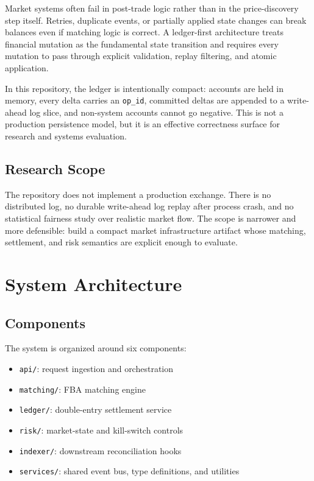 \documentclass[11pt]{article}
\begin{document}
Market systems often fail in post-trade logic rather than in the price-discovery step itself. Retries, duplicate events, or partially applied state changes can break balances even if matching logic is correct. A ledger-first architecture treats financial mutation as the fundamental state transition and requires every mutation to pass through explicit validation, replay filtering, and atomic application.

In this repository, the ledger is intentionally compact: accounts are held in memory, every delta carries an \texttt{op\_id}, committed deltas are appended to a write-ahead log slice, and non-system accounts cannot go negative. This is not a production persistence model, but it is an effective correctness surface for research and systems evaluation.

\subsection{Research Scope}

The repository does not implement a production exchange. There is no distributed log, no durable write-ahead log replay after process crash, and no statistical fairness study over realistic market flow. The scope is narrower and more defensible: build a compact market infrastructure artifact whose matching, settlement, and risk semantics are explicit enough to evaluate.

\section{System Architecture}

\subsection{Components}

The system is organized around six components:

\begin{itemize}[leftmargin=1.5em]
  \item \texttt{api/}: request ingestion and orchestration
  \item \texttt{matching/}: FBA matching engine
  \item \texttt{ledger/}: double-entry settlement service
  \item \texttt{risk/}: market-state and kill-switch controls
  \item \texttt{indexer/}: downstream reconciliation hooks
  \item \texttt{services/}: shared event bus, type definitions, and utilities
\end{itemize}
\end{document}
